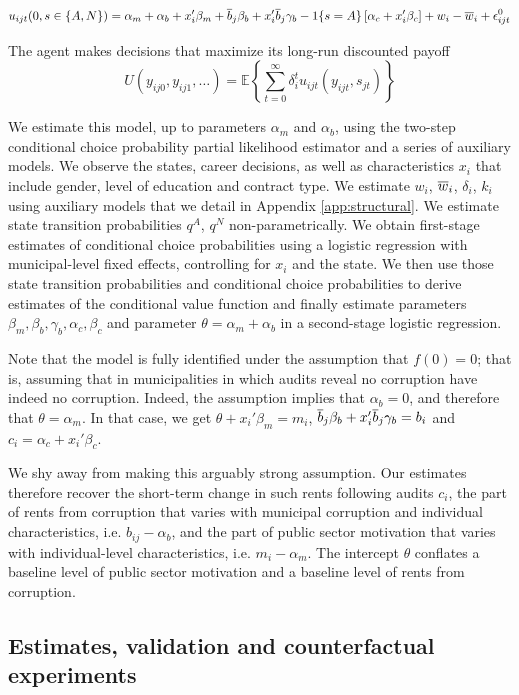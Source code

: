 {$$
    u_{ijt}(0, s \in \{A, N\}) = \alpha_m + \alpha_b + x_i' \beta_m + \overline{b}_j \beta_b + x_i' \overline{b}_j \gamma_b - 1\{s = A\} \left[\alpha_c + x_i' \beta_c \right] + w_i - \overline{w}_i + \epsilon^0_{ijt}
$$

The agent makes decisions that maximize its long-run discounted payoff
$$
U(y_{ij0}, y_{ij1}, \dots) = \mathbb{E} \left\{ \sum_{t=0}^\infty \delta_i^t u_{ijt}(y_{ijt}, s_{jt}) \right\}
$$

We estimate this model, up to parameters $\alpha_m$ and $\alpha_b$, using the two-step conditional choice probability partial likelihood estimator \citep{hotzmiller1993ccp} and a series of auxiliary models. We observe the states, career decisions, as well as characteristics $x_i$ that include gender, level of education and contract type. We estimate $w_i$, $\overline{w}_i$, $\delta_i$, $k_i$ using auxiliary models that we detail in Appendix \ref{app:structural}. We estimate state transition probabilities $q^A$, $q^N$ non-parametrically. We obtain first-stage estimates of conditional choice probabilities using a logistic regression with municipal-level fixed effects, controlling for $x_i$ and the state. We then use those state transition probabilities and conditional choice probabilities to derive estimates of the conditional value function and finally estimate parameters $\beta_m, \beta_b, \gamma_b, \alpha_c, \beta_c$ and parameter $\theta = \alpha_m + \alpha_b$ in a second-stage logistic regression. 

Note that the model is fully identified under the assumption that $f(0) = 0$; that is, assuming that in municipalities in which audits reveal no corruption have indeed no corruption. Indeed, the assumption implies that $\alpha_b = 0$, and therefore that $\theta = \alpha_m$. In that case, we get $\theta + x_i' \beta_m = m_i$, $\overline{b}_j \beta_b + x_i' \overline{b}_j \gamma_b = b_i$ and $c_i = \alpha_c + x_i' \beta_c$. 

We shy away from making this arguably strong assumption. Our estimates therefore recover the short-term change in such rents following audits $c_i$, the part of rents from corruption that varies with municipal corruption and individual characteristics, i.e. $b_{ij} - \alpha_b$, and the part of public sector motivation that varies with individual-level characteristics, i.e. $m_i - \alpha_m$. The intercept $\theta$ conflates a baseline level of public sector motivation and a baseline level of rents from corruption. 

\subsection{Estimates, validation and counterfactual experiments}

}

